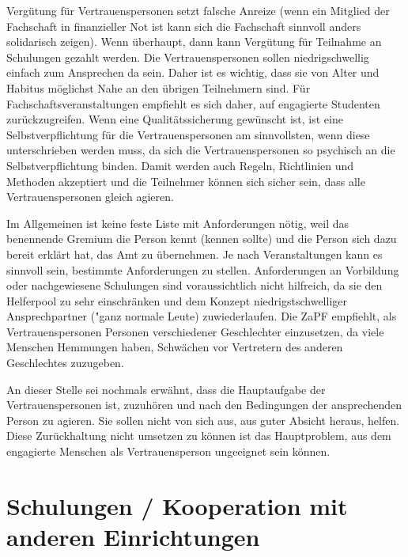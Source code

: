 \documentclass[DIV=calc]{scrartcl}
\begin{document}
Vergütung für Vertrauenspersonen setzt falsche Anreize (wenn ein Mitglied der Fachschaft in finanzieller Not ist kann sich die Fachschaft sinnvoll anders solidarisch zeigen). Wenn überhaupt, dann kann Vergütung für Teilnahme an Schulungen gezahlt werden.
Die Vertrauenspersonen sollen niedrigschwellig einfach zum Ansprechen da sein. Daher ist es wichtig, dass sie von Alter und Habitus möglichst Nahe an den übrigen Teilnehmern sind. Für Fachschaftsveranstaltungen empfiehlt es sich daher, auf engagierte Studenten zurückzugreifen.
Wenn eine Qualitätssicherung gewünscht ist, ist eine Selbstverpflichtung für die Vertrauenspersonen am sinnvollsten, wenn diese unterschrieben werden muss, da sich die Vertrauenspersonen so psychisch an die Selbstverpflichtung binden. Damit werden auch Regeln, Richtlinien und Methoden akzeptiert und die Teilnehmer können sich sicher sein, dass alle Vertrauenspersonen gleich agieren.

Im Allgemeinen ist keine feste Liste mit Anforderungen nötig, weil das benennende Gremium die Person kennt (kennen sollte) und die Person sich dazu bereit erklärt hat, das Amt zu übernehmen. Je nach Veranstaltungen kann es sinnvoll sein, bestimmte Anforderungen zu stellen. Anforderungen an Vorbildung oder nachgewiesene Schulungen sind voraussichtlich nicht hilfreich, da sie den Helferpool zu sehr einschränken und dem Konzept niedrigstschwelliger Ansprechpartner ("ganz normale Leute\grqq ) zuwiederlaufen.
Die ZaPF empfiehlt, als Vertrauenspersonen Personen verschiedener Geschlechter einzusetzen, da viele Menschen Hemmungen haben, Schwächen vor Vertretern des anderen Geschlechtes zuzugeben.

An dieser Stelle sei nochmals erwähnt, dass die Hauptaufgabe der Vertrauenspersonen ist, zuzuhören und nach den Bedingungen der ansprechenden Person zu agieren. Sie sollen nicht von sich aus, aus guter Absicht heraus, helfen. Diese Zurückhaltung nicht umsetzen zu können ist das Hauptproblem, aus dem engagierte Menschen als Vertrauensperson ungeeignet sein können.

\section{Schulungen / Kooperation mit anderen Einrichtungen}
\end{document}
